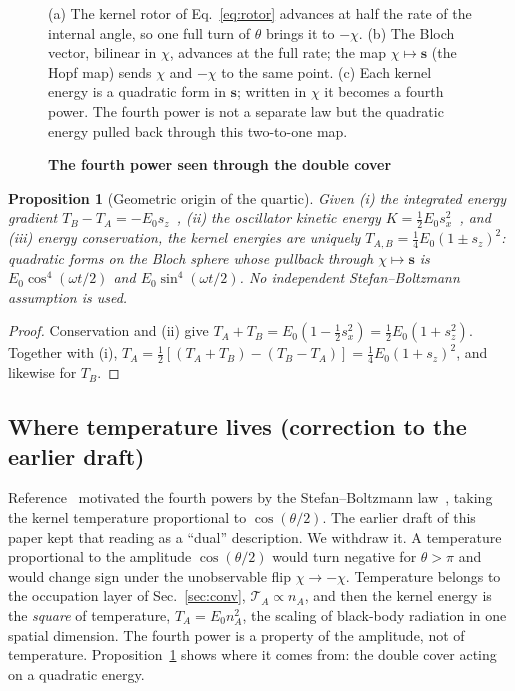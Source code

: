 \documentclass[%
 reprint, amsmath,amssymb, aps, prb, ]{revtex4-2}
\numberwithin{equation}{section}
\newtheorem{proposition}[theorem]{Proposition}
\newcommand{\Bloch}{\mathbf{s}}
\begin{document}
\begin{figure}[t!]
\caption{\textbf{The fourth power seen through the double cover}}
\label{fig:hopf}
\vspace{0.4em}
\begin{minipage}{0.95\textwidth}
\justifying\small
(a) The kernel rotor of Eq.~\eqref{eq:rotor} advances at half the rate of the internal angle, so one full turn of $\theta$ brings it to $-\chi$. (b) The Bloch vector, bilinear in $\chi$, advances at the full rate; the map $\chi\mapsto\Bloch$ (the Hopf map) sends $\chi$ and $-\chi$ to the same point. (c) Each kernel energy is a quadratic form in $\Bloch$; written in $\chi$ it becomes a fourth power. The fourth power is not a separate law but the quadratic energy pulled back through this two-to-one map.
\end{minipage}
\end{figure}

\begin{proposition}[Geometric origin of the quartic]
\label{prop:quartic}
Given (i) the integrated energy gradient $T_B-T_A=-E_0s_z$~\cite{ref:p1}, (ii) the oscillator kinetic energy $K=\tfrac12E_0s_x^2$~\cite{ref:p10}, and (iii) energy conservation, the kernel energies are uniquely $T_{A,B}=\tfrac14E_0(1\pm s_z)^2$: quadratic forms on the Bloch sphere whose pullback through $\chi\mapsto\Bloch$ is $E_0\cos^4(\omega t/2)$ and $E_0\sin^4(\omega t/2)$. No independent Stefan--Boltzmann assumption is used.
\end{proposition}

\begin{proof}
Conservation and (ii) give $T_A+T_B=E_0(1-\tfrac12s_x^2)=\tfrac12E_0(1+s_z^2)$. Together with (i), $T_A=\tfrac12[(T_A+T_B)-(T_B-T_A)]=\tfrac14E_0(1+s_z)^2$, and likewise for $T_B$.
\end{proof}

\subsection{Where temperature lives (correction to the earlier draft)}

Reference~\cite{ref:p1} motivated the fourth powers by the Stefan--Boltzmann law~\cite{ref:stefan,ref:boltzmann}, taking the kernel temperature proportional to $\cos(\theta/2)$. The earlier draft of this paper kept that reading as a ``dual'' description. We withdraw it. A temperature proportional to the amplitude $\cos(\theta/2)$ would turn negative for $\theta>\pi$ and would change sign under the unobservable flip $\chi\to-\chi$. Temperature belongs to the occupation layer of Sec.~\ref{sec:conv}, $\mathcal{T}_A\propto n_A$, and then the kernel energy is the \emph{square} of temperature, $T_A=E_0n_A^2$, the scaling of black-body radiation in one spatial dimension. The fourth power is a property of the amplitude, not of temperature. Proposition~\ref{prop:quartic} shows where it comes from: the double cover acting on a quadratic energy.
\end{document}
